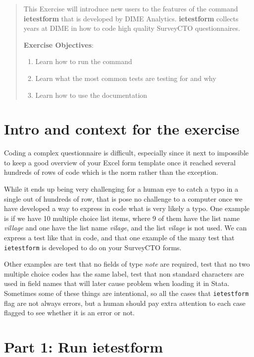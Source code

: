\documentclass{tufte-handout}
\begin{document}
\begin{abstract}
This Exercise will introduce new users to the features of the command \textbf{ietestform} that is developed by DIME Analytics. \textbf{ietestform} collects years at DIME in how to code high quality SurveyCTO questionnaires.


\bigskip\noindent \textbf{Exercise Objectives}:
\begin{enumerate}
  \item Learn how to run the command
  \item Learn what the most common tests are testing for and why
  \item Learn how to use the documentation 
\end{enumerate}
\end{abstract}

\section{Intro and context for the exercise}

	Coding a complex questionnaire is difficult, especially since it next to impossible to keep a good overview of your Excel form template once it reached several hundreds of rows of code which is the norm rather than the exception.
	
	While it ends up being very challenging for a human eye to catch a typo in a single out of hundreds of row, that is pose no challenge to a computer once we have developed a way to express in code what is very likely a typo. One example is if we have 10 multiple choice list items, where 9 of them have the list name \textit{village} and one have the list name \textit{vilage}, and the list \textit{vilage} is not used. We can express a test like that in code, and that one example of the many test that \verb|ietestform| is developed to do on your SurveyCTO forms.
	
	Other examples are test that no fields of type \textit{note} are required, test that no two multiple choice codes has the same label, test that non standard characters are used in field names that will later cause problem when loading it in Stata. Sometimes some of these things are intentional, so all the cases that \verb|ietestform| flag are not always errors, but a human should pay extra attention to each case flagged to see whether it is an error or not.

\section{Part 1: Run ietestform}
\end{document}
